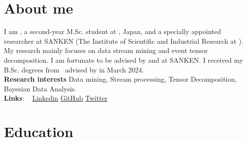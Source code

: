 \documentclass[9pt,a4paper]{article}
\begin{document}
\section{About me}
\vspace{1.0em}
I am \MyName, a second-year M.Sc.\! student at \OU, Japan, and a specially appointed researcher at SANKEN (The Institute of Scientific and Industrial Research at \OU).
My research mainly focuses on data stream mining and event tensor decomposition.
I am fortunate to be advised by \href{\YSakuraiURL}{\Prof{\YSakurai}} and \href{\YMatsubaraURL}{\Prof{\YMatsubara}} at SANKEN.
I received my B.Sc.\!  degrees from \OU\ advised by  \href{\YSakuraiURL}{\Prof{\YSakurai}} in March 2024.
\vspace{0.2em}
\\
\textbf{Research interests}
Data mining, Stream processing, Tensor Decomposition, Bayesian Data Analysis.
\vspace{0.2em}
\\
\textbf{Links}:
~\faLinkedin{} \href{https://www.linkedin.com/in/\Linkedin}{Linkedin}
\Separator{}
\faGithub{} \href{https://github.com/\GitHubProfile}{GitHub}
\Separator{}
\faTwitter{} \href{https://x.com/\Twitter}{Twitter}
\vspace{0.5em}

\section{Education}
\end{document}
